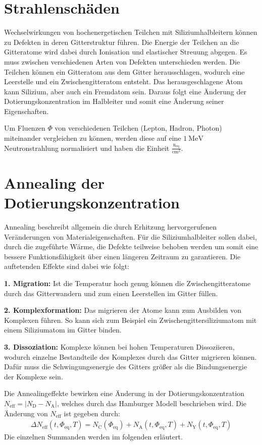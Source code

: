 \section{Strahlenschäden}
Wechselwirkungen von hochenergetischen Teilchen mit Siliziumhalbleitern können zu Defekten in deren
Gitterstruktur führen.
Die Energie der Teilchen an die Gitteratome wird dabei durch Ionisation und elastischer Streuung abgegen.
Es muss zwischen verschiedenen Arten von Defekten unterschieden werden. Die Teilchen können ein Gitteratom aus dem
Gitter herausschlagen, wodurch eine Leerstelle und ein Zwischengitteratom entsteht. Das herausgeschlagene Atom
kann Silizium, aber auch ein Fremdatom sein. Daraus folgt eine Änderung der Dotierungskonzentration im
Halbleiter und somit eine Änderung seiner Eigenschaften.

Um Fluenzen $ \Phi$ von verschiedenen Teilchen (Lepton, Hadron, Photon) miteinander vergleichen zu können, werden diese
auf eine $\SI{1}{\mega\eV}$ Neutronstrahlung normalisiert und haben die Einheit $\mathrm{\frac{n_{\mathrm{eq}}}{cm^2}}$.


\section{Annealing der Dotierungskonzentration}
Annealing beschreibt allgemein die durch Erhitzung hervorgerufenen Veränderungen von Materialeigenschaften. Für die
Siliziumhalbleiter sollen dabei, durch die zugeführte Wärme, die Defekte teilweise behoben werden um somit eine
bessere Funktionsfähigkeit über einen längeren Zeitraum zu garantieren. Die auftetenden Effekte sind dabei wie folgt:

\textbf{1. Migration:} Ist die Temperatur hoch genug können die Zwischengitteratome durch das Gitterwandern und
zum einen Leerstellen im Gitter füllen.

\textbf{2. Komplexformation:} Das migrieren der Atome kann zum Ausbilden von Komplexen führen. So kann sich zum Beispiel ein
Zwischengittersiliziumatom mit einem Siliziumatom im Gitter binden.

\textbf{3. Dissoziation:} Komplexe können bei hohen Temperaturen Dissoziieren, wodurch einzelne Bestandteile des Komplexes
durch das Gitter migrieren können. Dafür muss die Schwingungsenergie des Gitters größer als die Bindungsenergie der Komplexe sein.

Die Annealingeffekte bewirken eine Änderung in der Dotierungskonzentration $N_{\mathrm{eff}}= |N_{\mathrm{D}}-N_{\mathrm{A}}|$, welches durch das Hamburger Modell beschrieben wird.
Die Änderung von $N_{\mathrm{eff}}$ ist gegeben durch:
\begin{align}
  \Delta N_{\mathrm{eff}}(t, \Phi_{\mathrm{eq}}, T)   = N_{\mathrm{C}}(\Phi_{\mathrm{eq}}) + N_{\mathrm{A}}(t, \Phi_{\mathrm{eq}}, T) + N_{\mathrm{Y}}(t, \Phi_{\mathrm{eq}}, T)
\end{align}
Die einzelnen Summanden werden im folgenden erläutert.

